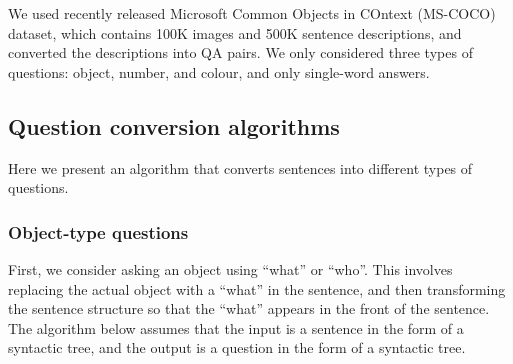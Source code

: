 We used recently released Microsoft Common Objects in COntext (MS-COCO) \cite{mscoco} dataset, which contains 100K images and 500K sentence descriptions, and converted the descriptions into QA pairs. We only considered three types of questions: object, number, and colour, and only single-word answers.

\subsection{Question conversion algorithms}
Here we present an algorithm that converts sentences into different types of questions.

\subsubsection{Object-type questions}
First, we consider asking an object using ``what'' or ``who''. This involves replacing the actual object with a ``what'' in the sentence, and then transforming the sentence structure so that the ``what'' appears in the front of the sentence. The algorithm below assumes that the input is a sentence in the form of a syntactic tree, and the output is a question in the form of a syntactic tree.

